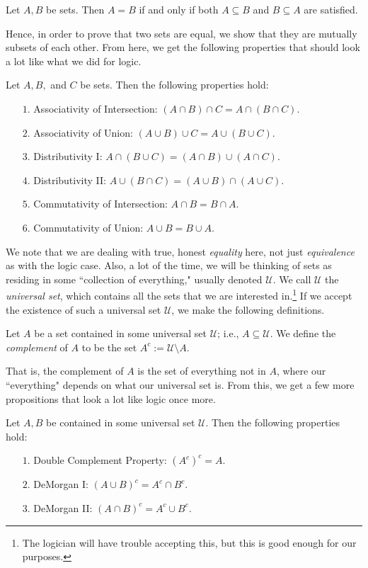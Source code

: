 \documentclass{article}
\begin{document}
\begin{proposition}
Let $A,B$ be sets. Then $A = B$ if and only if both $A\subseteq B$ and $B\subseteq A$ are satisfied.
\end{proposition}
Hence, in order to prove that two sets are equal, we show that they are mutually subsets of each other. From here, we get the following properties that should look a lot like what we did for logic.
\begin{proposition}
Let $A, B,$ and $C$ be sets. Then the following properties hold:
\begin{itemize}
    \item[$1.$] Associativity of Intersection: $(A\cap B) \cap C = A \cap (B\cap C)$.
    \item[$2.$] Associativity of Union: $(A\cup B) \cup C = A \cup (B\cup C)$.
    \item[$3.$] Distributivity I: $A \cap (B \cup C) = (A \cap B) \cup (A\cap C)$.
    \item[$4.$] Distributivity II: $A\cup (B \cap C) = (A \cup B)\cap (A\cup C)$.
    \item[$5.$] Commutativity of Intersection: $A\cap B = B\cap A$.
    \item[$6.$] Commutativity of Union: $A\cup B = B\cup A$.
\end{itemize}
\end{proposition}
We note that we are dealing with true, honest \textit{equality} here, not just \textit{equivalence} as with the logic case. Also, a lot of the time, we will be thinking of sets as residing in some ``collection of everything," usually denoted $\mathcal U$. We call $\mathcal U$ the \textit{universal set}, which contains all the sets that we are interested in.\footnote{The logician will have trouble accepting this, but this is good enough for our purposes.} If we accept the existence of such a universal set $\mathcal U$, we make the following definitions.
\begin{definition}
Let $A$ be a set contained in some universal set $\mathcal U$; i.e., $A\subseteq\mathcal U$. We define the \textit{complement} of $A$ to be the set $A^c := \mathcal U\setminus A$.
\end{definition}
That is, the complement of $A$ is the set of everything not in $A$, where our ``everything" depends on what our universal set is. From this, we get a few more propositions that look a lot like logic once more.
\begin{proposition}
Let $A, B$ be contained in some universal set $\mathcal U$. Then the following properties hold:
\begin{enumerate}
    \item[$1.$] Double Complement Property: $(A^c)^c = A$.
    \item[$2.$] DeMorgan I: $(A\cup B)^c = A^c \cap B^c$.
    \item[$3.$] DeMorgan II: $(A\cap B)^c = A^c \cup B^c$.
\end{enumerate}
\end{proposition}
\end{document}
